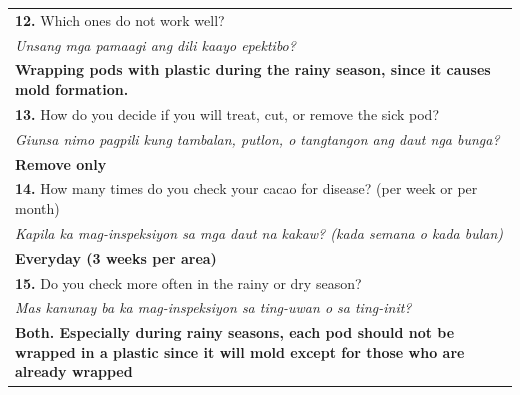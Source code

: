 {\begin{longtable}{|p{4cm}|p{10cm}|}
		\multicolumn{2}{|p{12cm}|}{\vspace{0.1cm} \textbf{12.} Which ones do not work well?}                                                                                                   \\
		\multicolumn{2}{|p{12cm}|}{\textit{Unsang mga pamaagi ang dili kaayo epektibo?}}                                                                                                       \\
		\multicolumn{2}{|p{12cm}|}{\textbf{Wrapping pods with plastic during the rainy season, since it causes mold formation.}}                                                               \\

		\multicolumn{2}{|p{12cm}|}{\vspace{0.1cm} \textbf{13.} How do you decide if you will treat, cut, or remove the sick pod?}                                                              \\
		\multicolumn{2}{|p{12cm}|}{\textit{Giunsa nimo pagpili kung tambalan, putlon, o tangtangon ang daut nga bunga?}}                                                                       \\
		\multicolumn{2}{|p{12cm}|}{\textbf{Remove only}}                                                                                                                                       \\

		\multicolumn{2}{|p{12cm}|}{\vspace{0.1cm} \textbf{14.} How many times do you check your cacao for disease? (per week or per month)}                                                    \\
		\multicolumn{2}{|p{12cm}|}{\textit{Kapila ka mag-inspeksiyon sa mga daut na kakaw? (kada semana o kada bulan)}}                                                                        \\
		\multicolumn{2}{|p{12cm}|}{\textbf{Everyday (3 weeks per area)}}                                                                                                                       \\

		\multicolumn{2}{|p{12cm}|}{\vspace{0.1cm} \textbf{15.} Do you check more often in the rainy or dry season?}                                                                            \\
		\multicolumn{2}{|p{12cm}|}{\textit{Mas kanunay ba ka mag-inspeksiyon sa ting-uwan o sa ting-init?}}                                                                                    \\
		\multicolumn{2}{|p{12cm}|}{\textbf{Both. Especially during rainy seasons, each pod should not be wrapped in a plastic since it will mold except for those who are already wrapped}}    \\


\end{longtable}}
